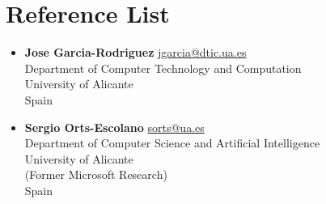 \documentclass[8pt]{article}
\begin{document}
\section*{Reference List}
\begin{itemize}
  \item {\textbf{Jose Garcia-Rodriguez} \href{mailto:jgarcia@dtic.ua.es}{jgarcia@dtic.ua.es}\\
  	Department of Computer Technology and Computation\\
  	University of Alicante\\
  	Spain}
  
  \item {\textbf{Sergio Orts-Escolano} \href{mailto:sorts@ua.es}{sorts@ua.es}\\
  	Department of Computer Science and Artificial Intelligence\\
 	University of Alicante\\
	(Former Microsoft Research)\\
 	Spain}


\end{itemize}
 
\end{document}
